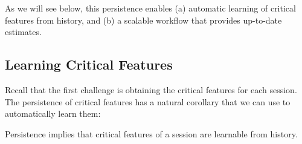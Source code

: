 As we will see below, this persistence enables 
(a) automatic learning  of critical features from history, 
and (b) a scalable workflow that provides 
up-to-date estimates. 


\subsection{Learning Critical Features}
\label{subsec:cfa:design:learning}

Recall that the first challenge is
obtaining the critical features for each session.
The  persistence of  critical features has a natural 
corollary that we can use to automatically learn them: 

\begin{imp}
Persistence  implies that 
critical features of a session are learnable from history.
\label{imp:learning}
\end{imp}



